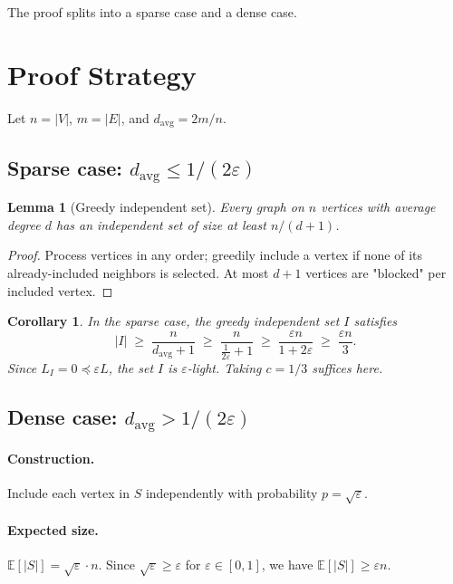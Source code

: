 \documentclass[12pt]{article}
\newtheorem{lemma}[theorem]{Lemma}
\newtheorem{corollary}[theorem]{Corollary}
\theoremstyle{definition}
\theoremstyle{remark}
\begin{document}
The proof splits into a sparse case and a dense case.

\section{Proof Strategy}

Let $n = |V|$, $m = |E|$, and $d_{\mathrm{avg}} = 2m/n$.

\subsection{Sparse case: \texorpdfstring{$d_{\mathrm{avg}} \le 1/(2\varepsilon)$}{sparse}}

\begin{lemma}[Greedy independent set]
Every graph on $n$ vertices with average degree $d$ has an independent set of size at least $n/(d+1)$.
\end{lemma}

\begin{proof}
Process vertices in any order; greedily include a vertex if none of its already-included neighbors is selected.  At most $d+1$ vertices are "blocked" per included vertex.
\end{proof}

\begin{corollary}
In the sparse case, the greedy independent set $I$ satisfies
\[
  |I| \;\ge\; \frac{n}{d_{\mathrm{avg}}+1} \;\ge\; \frac{n}{\frac{1}{2\varepsilon}+1} \;\ge\; \frac{\varepsilon n}{1 + 2\varepsilon} \;\ge\; \frac{\varepsilon n}{3}.
\]
Since $L_I = 0 \preceq \varepsilon L$, the set $I$ is $\varepsilon$-light.  Taking $c = 1/3$ suffices here.
\end{corollary}

\subsection{Dense case: \texorpdfstring{$d_{\mathrm{avg}} > 1/(2\varepsilon)$}{dense}}

\paragraph{Construction.}
Include each vertex in $S$ independently with probability $p = \sqrt{\varepsilon}$.

\paragraph{Expected size.}
$\mathbb{E}[|S|] = \sqrt{\varepsilon}\cdot n$.  Since $\sqrt{\varepsilon} \ge \varepsilon$ for $\varepsilon \in [0,1]$,
we have $\mathbb{E}[|S|] \ge \varepsilon n$.
\end{document}
